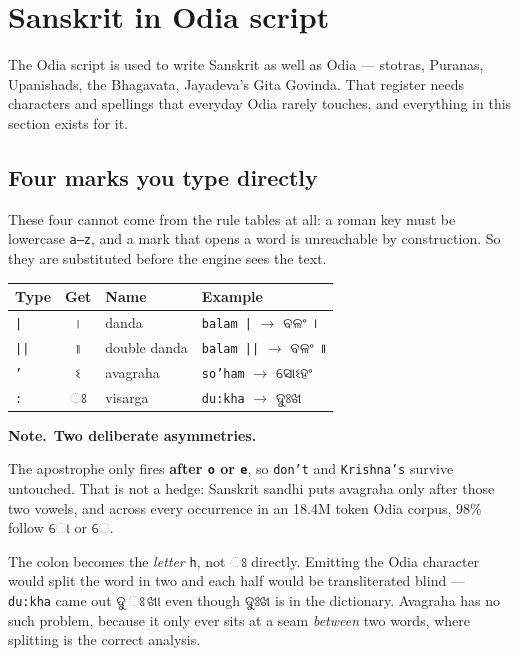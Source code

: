 \documentclass[11pt, a4paper]{article}
\newcommand{\od}[1]{{\odiafont #1}}          %
\newcommand{\odb}[1]{{\odiafont\large #1}}   %
\newcommand{\knote}{{\color{headerblue}\textbf{\textsf{Note.}}}\ }
\begin{document}
\section{Sanskrit in Odia script}
\label{sec:sanskrit}

The Odia script is used to write Sanskrit as well as Odia --- stotras, Puranas,
Upanishads, the Bhagavata, Jayadeva's Gita Govinda. That register needs characters
and spellings that everyday Odia rarely touches, and everything in this section exists
for it.

\subsection*{Four marks you type directly}

These four cannot come from the rule tables at all: a roman key must be lowercase
\texttt{a--z}, and a mark that opens a word is unreachable by construction. So they are
substituted before the engine sees the text.

\begin{center}
\begin{tabular}{l c l l}
\toprule
Type & Get & Name & Example \\
\midrule
\texttt{|}  & \odb{।} & danda        & \texttt{balam |}  $\rightarrow$ \od{ବଳଂ ।} \\
\texttt{||} & \odb{॥} & double danda & \texttt{balam ||} $\rightarrow$ \od{ବଳଂ ॥} \\
\texttt{'}  & \odb{ଽ} & avagraha     & \texttt{so'ham}   $\rightarrow$ \od{ସୋଽହଂ} \\
\texttt{:}  & \odb{ଃ} & visarga      & \texttt{du:kha}   $\rightarrow$ \od{ଦୁଃଖ} \\
\bottomrule
\end{tabular}
\end{center}

\begin{notebox}
\knote \textbf{Two deliberate asymmetries.}

The apostrophe only fires \textbf{after \texttt{o} or \texttt{e}}, so
\texttt{don't} and \texttt{Krishna's} survive untouched. That is not a hedge: Sanskrit
sandhi puts avagraha only after those two vowels, and across every occurrence in an 18.4M
token Odia corpus, 98\% follow \od{ୋ} or \od{େ}.

The colon becomes the \emph{letter} \texttt{h}, not \od{ଃ} directly. Emitting the Odia
character would split the word in two and each half would be transliterated blind ---
\texttt{du:kha} came out \od{ଦୁ}\,\od{ଃ}\,\od{ଖା} even though \od{ଦୁଃଖ} is in the
dictionary. Avagraha has no such problem, because it only ever sits at a seam
\emph{between} two words, where splitting is the correct analysis.
\end{notebox}
\end{document}
